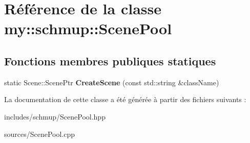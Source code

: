 \hypertarget{classmy_1_1schmup_1_1ScenePool}{}\section{Référence de la classe my\+:\+:schmup\+:\+:Scene\+Pool}
\label{classmy_1_1schmup_1_1ScenePool}
\subsection*{Fonctions membres publiques statiques}
\begin{DoxyCompactItemize}
\item 
\mbox{\label{classmy_1_1schmup_1_1ScenePool_a1bf01526822048e33687db6d734853ef}} 
static Scene\+::\+Scene\+Ptr {\bfseries Create\+Scene} (const std\+::string \&class\+Name)
\end{DoxyCompactItemize}


La documentation de cette classe a été générée à partir des fichiers suivants \+:\begin{DoxyCompactItemize}
\item 
includes/schmup/Scene\+Pool.\+hpp\item 
sources/Scene\+Pool.\+cpp\end{DoxyCompactItemize}
